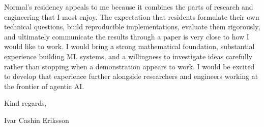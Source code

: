 \documentclass[11pt,a4paper]{moderncv}
\begin{document}
\vspace{4pt}
\hspace*{2em}
Normal's residency appeals to me because it combines the parts of research and engineering that I most enjoy. The expectation that residents formulate their own technical questions, build reproducible implementations, evaluate them rigorously, and ultimately communicate the results through a paper is very close to how I would like to work. I would bring a strong mathematical foundation, substantial experience building ML systems, and a willingness to investigate ideas carefully rather than stopping when a demonstration appears to work. I would be excited to develop that experience further alongside researchers and engineers working at the frontier of agentic AI.

\vspace{2em}
Kind regards,

Ivar Cashin Eriksson
\end{document}
